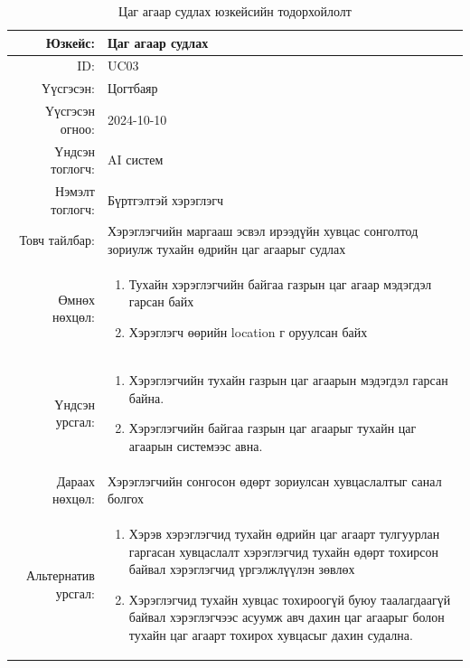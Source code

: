 \newpage
\begin{longtable}{|r|p{11.5cm}|}
    \caption{Цаг агаар судлах юзкейсийн тодорхойлолт} 
    \label{table:songolt1}\\ \hline
    {Юзкейс:} & {Цаг агаар судлах}\\ \hline
    {ID:} & {UC03}\\ \hline
    {Үүсгэсэн:} & {Цогтбаяр}\\ \hline
    {Үүсгэсэн огноо:} & {2024-10-10}\\ \hline
    {Үндсэн тоглогч:} & {AI систем}\\ \hline
    {Нэмэлт тоглогч:} & {Бүртгэлтэй хэрэглэгч}\\ \hline
    {Товч тайлбар:} & {Хэрэглэгчийн маргааш эсвэл ирээдүйн хувцас сонголтод зориулж тухайн өдрийн цаг агаарыг судлах}\\ \hline
    {Өмнөх нөхцөл:} & {\begin{enumerate}
        \item Тухайн хэрэглэгчийн байгаа газрын цаг агаар мэдэгдэл гарсан байх
        \item Хэрэглэгч өөрийн location г оруулсан байх 
    \end{enumerate}}\\ \hline
    {Үндсэн урсгал:} & {
    \begin{enumerate}
        \item Хэрэглэгчийн тухайн газрын цаг агаарын мэдэгдэл гарсан байна.
        \item Хэрэглэгчийн байгаа газрын цаг агаарыг тухайн цаг агаарын системээс авна.
       \end{enumerate}}\\ \hline
    {Дараах нөхцөл:} & {Хэрэглэгчийн сонгосон өдөрт зориулсан хувцаслалтыг санал болгох}\\ \hline
    {Альтернатив урсгал:} & {\begin{enumerate}
        \item Хэрэв хэрэглэгчид тухайн өдрийн цаг агаарт тулгуурлан гаргасан хувцаслалт хэрэглэгчид тухайн өдөрт тохирсон байвал хэрэглэгчид үргэлжлүүлэн зөвлөх  
        \item Хэрэглэгчид тухайн хувцас тохироогүй буюу таалагдаагүй байвал хэрэглэгчээс асуумж авч дахин цаг агаарыг болон тухайн цаг агаарт тохирох хувцасыг дахин судална.
        \end{enumerate}}\\ \hline
\end{longtable}
\newpage
